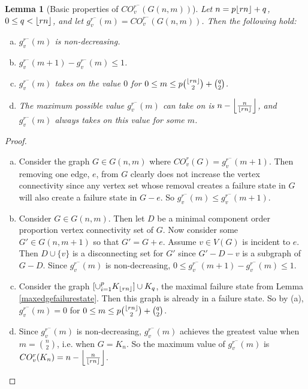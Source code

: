 \documentclass[12pt]{article}
\DeclarePairedDelimiter{\floor}{\lfloor}{\rfloor}
\newtheorem{lemma}[theorem]{Lemma}
\theoremstyle{definition}
\newcommand{\COV}[2]{CO^{#1}_{v}(#2)}
\newcommand{\COVMIN}[1]{CO^{r^-}_{v}(#1)}
\newcommand{\gvMIN}[1]{g_{v}^{r^-}(#1)}
\begin{document}
\begin{lemma}[Basic properties of $\COVMIN{G(n,m)}$]\label{covminprop}
Let $n=p\floor{rn}+q$, $0\le q < \floor{rn}$, and let $\gvMIN{m}=\COVMIN{G(n,m)}$. Then the following hold:
\begin{enumerate}[(a)]
  \item $\gvMIN{m}$ is non-decreasing.
  \item $\gvMIN{m+1}-\gvMIN{m} \leq 1$.
  \item $\gvMIN{m}$ takes on the value $0$ for $0 \le m \le p{\floor{rn} \choose 2} + {q \choose 2}$.
  \item The maximum possible value $\gvMIN{m}$ can take on is $n-\left\lfloor\frac{n}{\floor{rn}}\right\rfloor$, and $\gvMIN{m}$ always takes on this value for some $m$.
\end{enumerate}
\end{lemma}

\begin{proof} 
\hfill
\begin{enumerate}[(a)]
  \item Consider the graph $G \in G(n,m)$ where $\COV{r}{G} = \gvMIN{m+1}$. Then removing one edge, $e$, from $G$ clearly does not increase the vertex connectivity since any vertex set whose removal creates a failure state in $G$ will also create a failure state in $G-e$. 
  So $\gvMIN{m} \le \gvMIN{m+1}$.
  \item Consider $G \in G(n,m)$. Then let $D$ be a minimal component order proportion vertex connectivity set of $G$. Now consider some $G' \in G(n,m+1)$ so that $G'=G+e$. Assume $v\in V(G)$ is incident to $e$. Then $D\cup\{v\}$ is a disconnecting set for $G'$ since $G'-D-v$ is a subgraph of $G-D$. Since $\gvMIN{m}$ is non-decreasing, $0 \le \gvMIN{m+1}-\gvMIN{m}\le 1$.
  \item Consider the graph $  [\cup^{p}_{i=1}K_{\floor{rn}} ] \cup K_{q}$, the maximal failure state from Lemma \ref{maxedgefailurestate}. Then this graph is already in a failure state. So by (a), $\gvMIN{m}=0$ for $0\le m \le p {\floor{rn} \choose 2} + {q \choose 2}$.
  \item Since $\gvMIN{m}$ is non-decreasing, $\gvMIN{m}$ achieves the greatest value when $m=\binom{n}{2}$, i.e. when $G= K_n$. So the maximum value of $\gvMIN{m}$ is $\COV{r}{K_{n}}=n-\left\lfloor\frac{n}{\floor{rn}}\right\rfloor$.
\end{enumerate}
\end{proof}
\end{document}
